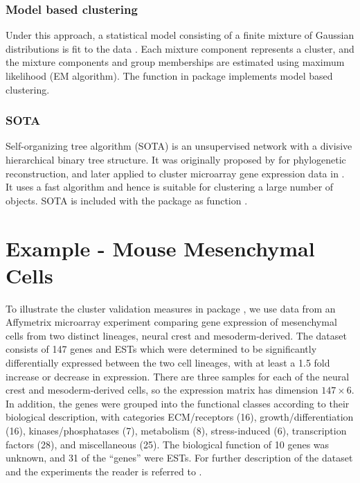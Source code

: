\documentclass[11pt]{article}
\begin{document}
\subsubsection*{Model based clustering}
Under this approach, a statistical model consisting of
a finite mixture of Gaussian distributions is fit to the
data  \citep{Fra2001}. 
Each mixture component represents a cluster, and the mixture
components and group memberships are estimated using 
maximum likelihood (EM algorithm).
The function  in package  implements model
based clustering.


\subsubsection*{SOTA}
Self-organizing tree algorithm (SOTA) is an unsupervised
network with a divisive hierarchical binary tree structure. 
It was originally proposed by \citet{Dop1997} for phylogenetic
reconstruction, and later applied to cluster microarray gene
expression data in \citep{Her2001}. 
It uses a fast algorithm and hence is suitable
for clustering a large number of objects.
SOTA is included with the  package as function .





\section{Example - Mouse Mesenchymal Cells}
\label{sec:illustration}

To illustrate the cluster validation measures in package
, we use data from an Affymetrix microarray experiment
comparing gene expression of mesenchymal cells from two distinct
lineages, neural crest and mesoderm-derived.  The dataset consists of
147 genes and ESTs which were determined to
be significantly differentially expressed between the two cell lineages,
with at least a 1.5 fold increase or decrease in expression.  There
are three samples for each of the neural crest and mesoderm-derived
cells, so the expression matrix has dimension $147\times 6$.  In
addition, the genes were grouped into the functional classes according
to their biological description, with categories ECM/receptors (16),
growth/differentiation (16), kinases/phosphatases (7), metabolism (8),
stress-induced (6), transcription factors (28), and miscellaneous
(25).  The biological function of 10 genes was unknown, and 31 of the
``genes'' were ESTs.
For further description of the dataset and the experiments the reader is referred to \citet{Bha2007}.
\end{document}
